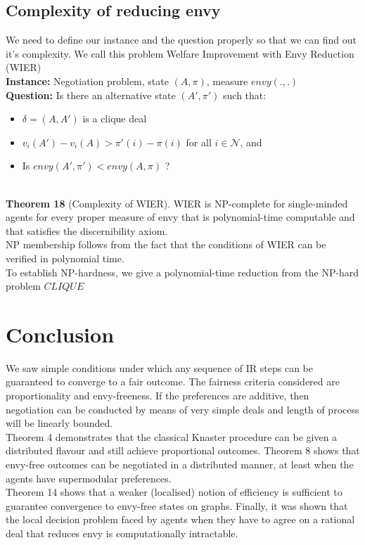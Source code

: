 \documentclass{article}
\begin{document}
\subsection{Complexity of reducing envy}
We need to define our instance and the question properly so that we can find out it's complexity. We call this problem Welfare Improvement with Envy Reduction (WIER)\\
\textbf{Instance:} Negotiation problem, state $(A,\pi)$, measure $envy(.,.)$ \\
\textbf{Question:} Is there an alternative state $(A',\pi')$ such that:
\begin{itemize}
    \item $\delta = (A, A')$ is a clique deal 
    \item $v_i(A')-v_i(A) > \pi'(i)-\pi(i)$ for all $i \in \mathcal{N}$, and 
    \item Is $envy(A',\pi') < envy(A,\pi)$ ?
\end{itemize}
\\
\textbf{Theorem 18} (Complexity of WIER). WIER is NP-complete for  single-minded agents for every proper measure of envy that is polynomial-time computable and that satisfies the discernibility axiom.\\
NP membership follows from the fact that the conditions of WIER can be verified in polynomial time. \\
To establish NP-hardness, we give a polynomial-time reduction from the NP-hard problem $CLIQUE$
\section{Conclusion}
We saw simple conditions under which any sequence of IR steps can be guaranteed to converge to a fair outcome.  The fairness criteria considered are proportionality and envy-freeness. If the preferences are additive, then negotiation can be conducted by means of very simple deals and length of process will be linearly bounded. \\
Theorem 4 demonstrates that the classical Knaster procedure can be  given a distributed flavour and still achieve proportional outcomes. Theorem 8 shows that envy-free outcomes can be negotiated in a distributed manner, at least when the agents have supermodular preferences. \\
Theorem 14 shows that a weaker (localised) notion of efficiency is sufficient to guarantee convergence to envy-free states on graphs. Finally, it was shown that the local decision problem faced by agents when they have to agree on a rational deal that reduces envy is computationally intractable.
\end{document}

